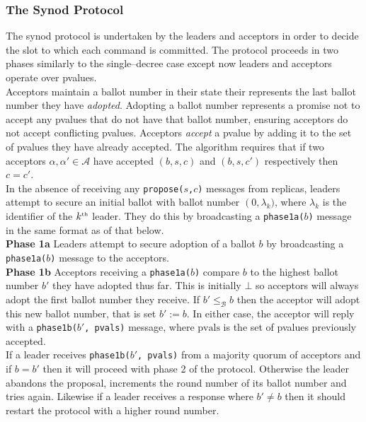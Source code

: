 \subsubsection{The Synod Protocol}

The synod protocol is undertaken by the leaders and acceptors in order to decide the slot to which each command is committed. The protocol proceeds in two phases similarly to the single--decree case except now leaders and acceptors operate over pvalues. \\

Acceptors maintain a ballot number in their state their represents the last ballot number they have \emph{adopted}. Adopting a ballot number represents a promise not to accept any pvalues that do not have that ballot number, ensuring acceptors do not accept conflicting pvalues. Acceptors \emph{accept} a pvalue by adding it to the set of pvalues they have already accepted. The algorithm requires that if two acceptors $\alpha, \alpha' \in \mathcal{A}$ have accepted $(b,s,c)$ and $(b,s,c')$ respectively then $c = c'$. \\

In the absence of receiving any \texttt{propose($s$,$c$)} messages from replicas, leaders attempt to secure an initial ballot with ballot number $\left(0, \lambda_k)$, where $\lambda_k$ is the identifier of the $k^{\text{\tiny th}}$ leader. They do this by broadcasting a \texttt{phase1a($b$)} message in the same format as of that below. \\

\textbf{Phase 1a} Leaders attempt to secure adoption of a ballot $b$ by broadcasting a \texttt{phase1a($b$)} message to the acceptors. \\

\textbf{Phase 1b} Acceptors receiving a \texttt{phase1a($b$)} compare $b$ to the highest ballot number $b'$ they have adopted thus far. This is initially $\bot$ so acceptors will always adopt the first ballot number they receive. If $b' \leq_\mathcal{B} b$ then the acceptor will adopt this new ballot number, that is set $b' := b$. In either case, the acceptor will reply with a \texttt{phase1b($b'$, pvals)} message, where $\textrm{pvals}$ is the set of pvalues previously accepted. \\

If a leader receives \texttt{phase1b($b'$, pvals)} from a majority quorum of acceptors and if $b = b'$ then it will proceed with phase 2 of the protocol. Otherwise the leader abandons the proposal, increments the round number of its ballot number and tries again. Likewise if a leader receives a response where $b' \neq b$ then it should restart the protocol with a higher round number. \\

